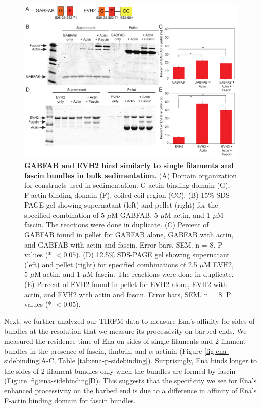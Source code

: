 \begin{figure}
\centering
\includegraphics[width=\textwidth]{img/ch02/sedimentation_thesis.pdf}
\caption[GABFAB and EVH2 bind similarly to single filaments and fascin bundles in bulk sedimentation.]{\textbf{GABFAB and EVH2 bind similarly to single filaments and fascin bundles in bulk sedimentation.} (A) Domain organization for constructs used in sedimentation. G-actin binding domain (G), F-actin binding domain (F), coiled coil region (CC). (B) 15\% SDS-PAGE gel showing supernatant (left) and pellet (right) for the specified combination of 5 $\mu$M GABFAB, 5 $\mu$M actin, and 1 $\mu$M fascin. The reactions were done in duplicate. (C) Percent of GABFAB found in pellet for GABFAB alone, GABFAB with actin, and GABFAB with actin and fascin. Error bars, SEM. n = 8. P values (* $<0.05$). (D) 12.5\% SDS-PAGE gel showing supernatant (left) and pellet (right) for specified combinations of 2.5 $\mu$M EVH2, 5 $\mu$M actin, and 1 $\mu$M fascin. The reactions were done in duplicate. (E) Percent of EVH2 found in pellet for EVH2 alone, EVH2 with actin, and EVH2 with actin and fascin. Error bars, SEM. n = 8. P values (* $<0.05$).}
\label{fig:sedimentation}
\end{figure}

Next, we further analyzed our TIRFM data to measure Ena's affinity for sides of bundles at the resolution that we measure its processivity on barbed ends. We measured the residence time of Ena on sides of single filaments and 2-filament bundles in the presence of fascin, fimbrin, and $\alpha$-actinin (Figure \ref{fig:ena-sidebinding}A-C, Table \ref{tab:ena-p-sidebinding}). Surprisingly, Ena binds longer to the sides of 2-filament bundles only when the bundles are formed by fascin (Figure \ref{fig:ena-sidebinding}D). This suggests that the specificity we see for Ena's enhanced processivity on the barbed end is due to a difference in affinity of Ena's F-actin binding domain for fascin bundles. 

